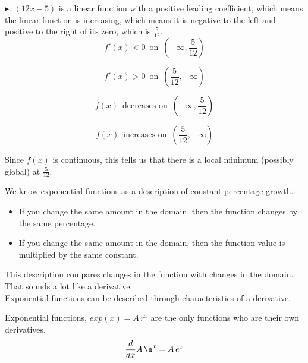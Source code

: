 \documentclass{ximera}
\begin{document}
\begin{example}
$\blacktriangleright$. $(12x - 5)$ is a linear function with a positive leading coefficient, which means the linear function is increasing, which means it is negative to the left and positive to the right of its zero, which is $\frac{5}{12}$. \\



\[
f'(x) < 0 \, \text{ on } \, \left( -\infty, \frac{5}{12} \right)
\]


\[
f'(x) > 0 \, \text{ on } \, \left( \frac{5}{12}, -\infty \right)
\]





\[
f(x)  \, \text{ decreases on } \, \left( -\infty, \frac{5}{12} \right)
\]


\[
f(x)  \, \text{ increases on } \, \left( \frac{5}{12}, -\infty \right)
\]



Since $f(x)$ is continuous, this tells us that there is a local minimum (possibly global) at $\frac{5}{12}$.


\end{example}






\begin{idea}


We know exponential functions as a description of constant percentage growth. 

\begin{itemize}
	\item If you change the same amount in the domain, then the function changes by the same percentage.
	\item If you change the same amount in the domain, then the function value is multiplied by the same constant.
\end{itemize}



This description compares changes in the function with changes in the domain. That sounds a lot like a derivative. \\

Exponential functions can be described through characteristics of a derivative.


\begin{center}

Exponential functions, $exp(x) = A \, r^x$ are the only functions who are their own derivatives. \\

\[
\frac{d}{dx} A \, \e^x = A \, e^x
\]


\end{center}


\end{idea}
\end{document}
